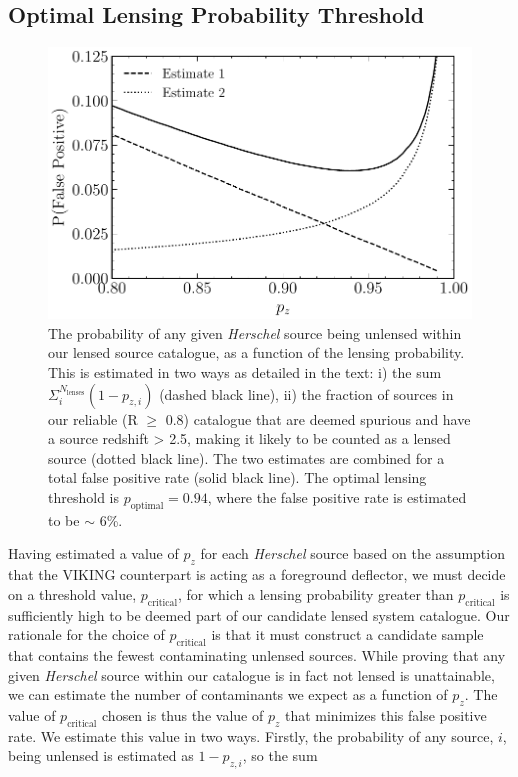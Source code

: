 \documentclass[fleqn,usenatbib]{mnras}
\begin{document}
\subsection{Optimal Lensing Probability Threshold}
\label{sec:optimal_lensing_probability}

\begin{figure}
	\includegraphics[width=\columnwidth]{Fig_10}
	\caption{The probability of any given \textit{Herschel} source being unlensed within our lensed source catalogue, as a function of the lensing probability. This is estimated in two ways as detailed in the text: i) the sum $\Sigma_i^{N_{\textrm{lenses}}} (1 - p_{z,i})$ (dashed black line), ii) the fraction of sources in our reliable (R $\geq$ 0.8) catalogue that are deemed spurious and have a source redshift > 2.5, making it likely to be counted as a lensed source (dotted black line). The two estimates are combined for a total false positive rate (solid black line). The optimal lensing threshold is $p_{\textrm{optimal}} = 0.94$, where the false positive rate is estimated to be $\sim$ 6\%.} 
	\label{fig:false_positive_rate}
\end{figure}

Having estimated a value of $p_z$ for each \textit{Herschel} source based on the assumption that the VIKING counterpart is acting as a foreground deflector, we must decide on a threshold value, $p_{\textrm{critical}}$, for which a lensing probability greater than $p_{\textrm{critical}}$ is sufficiently high to be deemed part of our candidate lensed system catalogue. Our rationale for the choice of $p_{\textrm{critical}}$ is that it must construct a candidate sample that contains the fewest contaminating unlensed sources. While proving that any given \textit{Herschel} source within our catalogue is in fact not lensed is unattainable, we can estimate the number of contaminants we expect as a function of $p_z$. The value of $p_{\textrm{critical}}$ chosen is thus the value of $p_z$ that minimizes this false positive rate. We estimate this value in two ways. Firstly, the probability of any source, $i$, being unlensed is estimated as $1 - p_{z,i}$, so the sum
\end{document}
